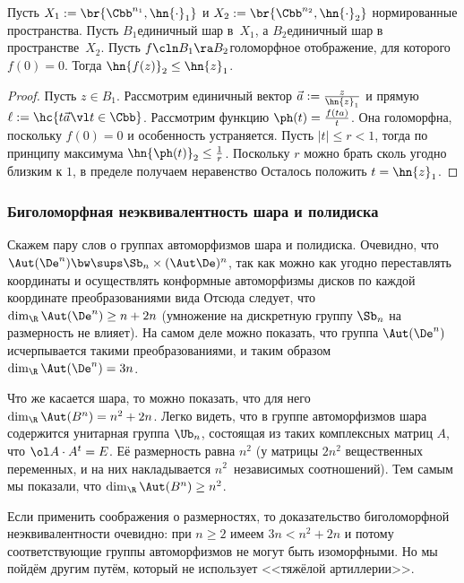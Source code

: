 \documentclass[a4paper]{article}
\begin{document}
\begin{lemma}[Шварца]
Пусть $X_1 := \br{\Cbb^{n_1},\hn{\cdot}_1}$ и $X_2 := \br{\Cbb^{n_2},\hn{\cdot}_2}$\т
нормированные пространства. Пусть $B_1$\т единичный шар в~$X_1$, а $B_2$\т единичный
шар в пространстве~$X_2$.
Пусть $f\cln B_1 \ra B_2$\т голоморфное отображение, для которого $f(0) = 0$. Тогда
$\hn{f(z)}_2 \le \hn{z}_1$.
\end{lemma}
\begin{proof}
Пусть $z \in B_1$. Рассмотрим единичный вектор $\vec a := \frac{z}{\hn{z}_1}$ и прямую
$\ell := \hc{t\vec a\vl t \in \Cbb}$. Рассмотрим функцию $\ph(t) = \frac{f(ta)}{t}$.
Она голоморфна, поскольку $f(0) = 0$ и особенность устраняется. Пусть $|t| \le r < 1$,
тогда по принципу максимума $\hn{\ph(t)}_2 \le \frac1r$. Поскольку $r$ можно брать сколь
угодно близким к $1$, в пределе получаем неравенство
Осталось положить $t = \hn{z}_1$.
\end{proof}


\subsubsection{Биголоморфная неэквивалентность шара и полидиска}

Скажем пару слов о группах автоморфизмов шара и полидиска.
Очевидно, что $\Aut(\De^n) \bw\sups \Sb_n \times (\Aut \De)^n$, так как можно как угодно переставлять
координаты и осуществлять конформные автоморфизмы дисков по каждой координате
преобразованиями вида
Отсюда следует, что $\dim_\R \Aut(\De^n) \ge n+2n$ (умножение на дискретную группу $\Sb_n$
на размерность не влияет).
На самом деле можно показать, что группа $\Aut(\De^n)$ исчерпывается такими преобразованиями,
и таким образом $\dim_\R \Aut(\De^n) = 3n$.

Что же касается шара, то можно показать, что для него $\dim_\R \Aut(B^n) = n^2 + 2n$. Легко видеть, что
в группе автоморфизмов шара содержится унитарная группа $\Ub_n$, состоящая из таких комплексных
матриц $A$, что $\ol A \cdot A^t = E$. Её размерность равна $n^2$ (у матрицы $2n^2$ вещественных переменных,
и на них накладывается $n^2$~независимых соотношений). Тем самым мы показали, что $\dim_\R \Aut(B^n) \ge n^2$.

Если применить соображения о размерностях, то доказательство биголоморфной неэквивалентности очевидно:
при $n \ge 2$ имеем $3n < n^2 +2n$ и потому соответствующие группы автоморфизмов не могут быть изоморфными.
Но мы пойдём другим путём, который не использует <<тяжёлой артиллерии>>.
\end{document}
